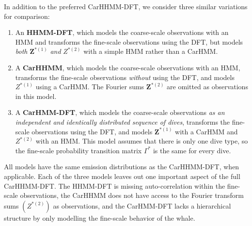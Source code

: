 In addition to the preferred CarHHMM-DFT, we consider three similar variations for comparison:
\begin{enumerate}
    \item An \textbf{HHMM-DFT}, which models the coarse-scale observations with an HMM and transforms the fine-scale observations using the DFT, but models \textit{both} $\mathbf{Z}^{*(1)}$ \textit{and} $Z^{*(2)}$ with a simple HMM rather than a CarHMM.
    \item A \textbf{CarHHMM}, which models the coarse-scale observations with an HMM, transforms the fine-scale observations \textit{without} using the DFT, and models $Z^{*(1)}$ using a CarHMM. The Fourier sums $\mathbf{Z}^{*(2)}$ are omitted as observations in this model.
    \item A \textbf{CarHMM-DFT}, which models the coarse-scale observations \textit{as an independent and identically distributed sequence of dives}, transforms the fine-scale observations using the DFT, and models $\mathbf{Z}^{*(1)}$ with a CarHMM and $Z^{*(2)}$ with an HMM. This model assumes that there is only one dive type, so the fine-scale probability transition matrix $\Gamma^*$ is the same for every dive. 
\end{enumerate}
All models have the same emission distributions as the CarHHMM-DFT, when applicable. Each of the three models leaves out one important aspect of the full CarHHMM-DFT. The HHMM-DFT is missing auto-correlation within the fine-scale observations, the CarHHMM does not have access to the Fourier transform sums $(Z^{*(2)})$ as observations, and the CarHMM-DFT lacks a hierarchical structure by only modelling the fine-scale behavior of the whale.